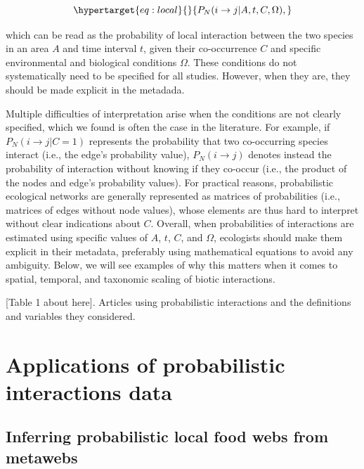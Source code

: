 \documentclass[10pt,oneside]{article}
\begin{document}
\begin{equation}\protect\hypertarget{eq:local}{}{P_{N}(i \rightarrow j | A, t, C, \Omega),}\label{eq:local}\end{equation}

which can be read as the probability of local interaction between the
two species in an area \(A\) and time interval \(t\), given their
co-occurrence \(C\) and specific environmental and biological conditions
\(\Omega\). These conditions do not systematically need to be specified
for all studies. However, when they are, they should be made explicit in
the metadada.

Multiple difficulties of interpretation arise when the conditions are
not clearly specified, which we found is often the case in the
literature. For example, if \(P_{N}(i \rightarrow j | C = 1)\)
represents the probability that two co-occurring species interact (i.e.,
the edge's probability value), \(P_{N}(i \rightarrow j)\) denotes
instead the probability of interaction without knowing if they co-occur
(i.e., the product of the nodes and edge's probability values). For
practical reasons, probabilistic ecological networks are generally
represented as matrices of probabilities (i.e., matrices of edges
without node values), whose elements are thus hard to interpret without
clear indications about \(C\). Overall, when probabilities of
interactions are estimated using specific values of \(A\), \(t\), \(C\),
and \(\Omega\), ecologists should make them explicit in their metadata,
preferably using mathematical equations to avoid any ambiguity. Below,
we will see examples of why this matters when it comes to spatial,
temporal, and taxonomic scaling of biotic interactions.

{[}Table 1 about here{]}. Articles using probabilistic interactions and
the definitions and variables they considered.

\hypertarget{applications-of-probabilistic-interactions-data}{%
\section{Applications of probabilistic interactions
data}\label{applications-of-probabilistic-interactions-data}}

\hypertarget{inferring-probabilistic-local-food-webs-from-metawebs}{%
\subsection{Inferring probabilistic local food webs from
metawebs}\label{inferring-probabilistic-local-food-webs-from-metawebs}}
\end{document}
